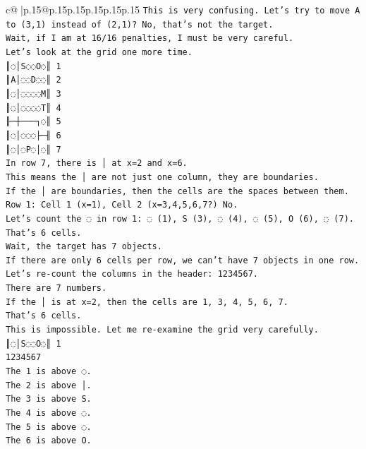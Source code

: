 \documentclass{article}
\begin{document}
{\begin{supertabular}{c@{$\;$}|p{.15\linewidth}@{}p{.15\linewidth}p{.15\linewidth}p{.15\linewidth}p{.15\linewidth}p{.15\linewidth}}
{{{\texttt{This is very confusing. Let's try to move A to (3,1) instead of (2,1)? No, that's not the target.} \\
\texttt{Wait, if I am at 16/16 penalties, I must be very careful.} \\
\texttt{Let's look at the grid one more time.} \\
\texttt{║◌│S◌◌O◌║ 1} \\
\texttt{║A│◌◌D◌◌║ 2} \\
\texttt{║◌│◌◌◌◌M║ 3} \\
\texttt{║◌│◌◌◌◌T║ 4} \\
\texttt{╟─┼───┐◌║ 5} \\
\texttt{║◌│◌◌◌├─╢ 6} \\
\texttt{║◌│◌P◌│◌║ 7} \\
\texttt{In row 7, there is │ at x=2 and x=6.} \\
\texttt{This means the │ are not just one column, they are boundaries.} \\
\texttt{If the │ are boundaries, then the cells are the spaces between them.} \\
\texttt{Row 1: Cell 1 (x=1), Cell 2 (x=3,4,5,6,7?) No.} \\
\texttt{Let's count the ◌ in row 1: ◌ (1), S (3), ◌ (4), ◌ (5), O (6), ◌ (7).} \\
\texttt{That's 6 cells.} \\
\texttt{Wait, the target has 7 objects.} \\
\texttt{If there are only 6 cells per row, we can't have 7 objects in one row.} \\
\texttt{Let's re{-}count the columns in the header: 1234567.} \\
\texttt{There are 7 numbers.} \\
\texttt{If the │ is at x=2, then the cells are 1, 3, 4, 5, 6, 7.} \\
\texttt{That's 6 cells.} \\
\texttt{This is impossible. Let me re{-}examine the grid very carefully.} \\
\texttt{║◌│S◌◌O◌║ 1} \\
\texttt{1234567} \\
\texttt{The 1 is above ◌.} \\
\texttt{The 2 is above │.} \\
\texttt{The 3 is above S.} \\
\texttt{The 4 is above ◌.} \\
\texttt{The 5 is above ◌.} \\
\texttt{The 6 is above O.} \\
}}}
\end{supertabular}}
\end{document}
